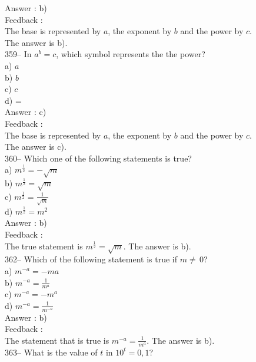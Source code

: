 ﻿\documentclass[letterpaper, 12pt]{article}
\begin{document}
Answer : b)\\

Feedback : \\
The base is represented by $a$, the exponent by $b$ and the power by $c$.\\
The answer is b).\\

359-- In $a^{b}=c$, which symbol represents the the power?\\
a) $a$\\
b) $b$\\
c) $c$\\
d) =\\

Answer : c)\\

Feedback : \\
The base is represented by $a$, the exponent by $b$ and the power by $c$.\\
The answer is c).\\

360-- Which one of the following statements is true?\\
a) $m^{\frac{1}{2}}=-\sqrt{m}$\\
b) $m^{\frac{1}{2}}=\sqrt{m}$\\
c) $m^{\frac{1}{2}}=\frac{1}{\sqrt{m}}$\\
d) $m^{\frac{1}{2}}=m^{2}$\\

Answer : b)\\

Feedback : \\
The true statement is $m^{\frac{1}{2}}=\sqrt{m}$.  The answer is b).\\


362-- Which of the following statement is true if $m\neq\,$0?\\
a) $m^{-a}=-ma$\\[2mm]
b) $m^{-a}=\frac{1}{m^{a}}$\\[2mm]
c) $m^{-a}=-m^{a}$\\[2mm]
d) $m^{-a}=\frac{1}{m^{-a}}$\\

Answer : b)\\

Feedback : \\
The statement that is true is $m^{-a}=\frac{1}{m^{a}}$.  The answer is
b).\\

363-- What is the value of $t$ in $10^{t}=0,1$?\\
\end{document}
